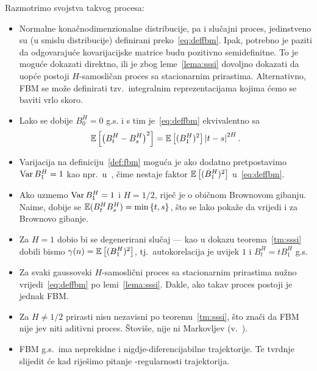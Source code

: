 \documentclass[main.tex]{subfiles}
\begin{document}
\noindent Razmotrimo svojstva takvog procesa:
\begin{itemize}
	\item Normalne konačnodimenzionalne distribucije, pa i slučajni proces, jedinstveno su (u smislu distribucije) definirani preko~\eqref{eq:deffbm}. Ipak, potrebno je paziti da odgovarajuće kovarijacijske matrice budu pozitivno semidefinitne. To je moguće dokazati direktno,
	      ili je zbog leme~\ref{lema:sssi} dovoljno dokazati da uopće postoji \( H \)-samosličan
	      proces sa stacionarnim prirastima. Alternativno, FBM se može definirati tzv.\ integralnim
	      reprezentacijama kojima ćemo se baviti vrlo skoro.

	\item Lako se dobije \( B^H_0 = 0 \) g.s. i s tim je~\eqref{eq:deffbm} ekvivalentno sa
	      \begin{equation}\label{eq:deffbmalt}
		      \mathbb{E} \left[ \left( B^H_t-B^H_s \right)^2 \right] = \mathbb{E}\left[ (B^H_1)^2 \right] \left| {t-s} \right|^{2H}.
	      \end{equation}


	\item Varijacija na definiciju~\ref{def:fbm} moguća je ako dodatno pretpostavimo \( \operatorname{Var} B_1^H = 1 \) kao npr.\ u~\cite{se}, čime nestaje faktor \( \mathbb{E}\left[ (B_1^H)^2 \right] \) u~\eqref{eq:deffbm}.

	\item Ako uzmemo \( \operatorname{Var} B_1^H = 1 \) i \( H=1/2 \), riječ je o običnom Brownovom gibanju. Naime, dobije se \( \mathbb{E}(B^H_tB^H_s) = \min\left\{ t,s \right\} \), što se lako pokaže da vrijedi i za Brownovo gibanje.
	\item Za \( H=1 \) dobio bi se degenerirani slučaj --- kao u dokazu teorema~\ref{tm:sssi} dobili bismo \( \gamma(n) = \mathbb{E}\left[ (B^H_1)^2 \right] \), tj.\ autokorelacija je uvijek \( 1 \) i
	      \( B^H_t = tB_1^H \) g.s.

	\item Za svaki gaussovski \( H \)-samoslični proces sa stacionarnim prirastima
	      nužno vrijedi~\eqref{eq:deffbm} po lemi~\eqref{lema:sssi}. Dakle,
	      ako takav proces postoji je jednak FBM.


	\item Za \( H \neq 1/2 \) prirasti nisu nezavisni po teoremu~\ref{tm:sssi}, što znači da FBM nije \levy jev niti aditivni proces. Štoviše, nije ni Markovljev (v.~\cite{se}).

	\item FBM g.s.\ ima neprekidne i nigdje-diferencijabilne trajektorije. Te tvrdnje
	      slijedit će kad riješimo pitanje \holder -regularnosti trajektorija.


\end{itemize}
\end{document}
